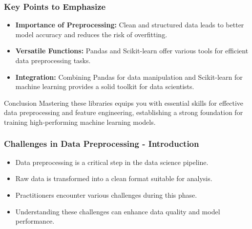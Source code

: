 \documentclass[aspectratio=169]{beamer}
\begin{document}
\begin{frame}
    \frametitle{Key Points to Emphasize}
    \begin{itemize}
        \item \textbf{Importance of Preprocessing:} Clean and structured data leads to better model accuracy and reduces the risk of overfitting.
        \item \textbf{Versatile Functions:} Pandas and Scikit-learn offer various tools for efficient data preprocessing tasks.
        \item \textbf{Integration:} Combining Pandas for data manipulation and Scikit-learn for machine learning provides a solid toolkit for data scientists.
    \end{itemize}

    \begin{block}{Conclusion}
        Mastering these libraries equips you with essential skills for effective data preprocessing and feature engineering, establishing a strong foundation for training high-performing machine learning models.
    \end{block}
\end{frame}

\begin{frame}[fragile]
    \frametitle{Challenges in Data Preprocessing - Introduction}
    \begin{itemize}
        \item Data preprocessing is a critical step in the data science pipeline.
        \item Raw data is transformed into a clean format suitable for analysis.
        \item Practitioners encounter various challenges during this phase.
        \item Understanding these challenges can enhance data quality and model performance.
    \end{itemize}
\end{frame}
\end{document}
